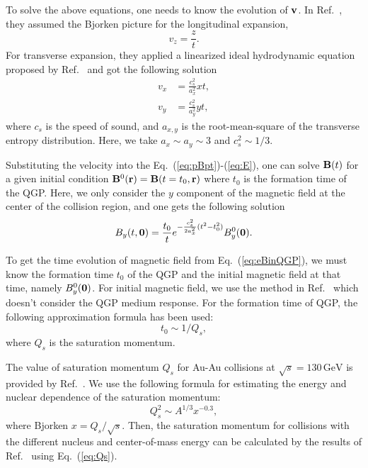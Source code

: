 \documentclass[preprint]{elsarticle}
\begin{document}
To solve the above equations, one needs to know the evolution of $\vb{v}$. In Ref.~\cite{Deng:2012pc}, they assumed the Bjorken picture for the longitudinal expansion,
\begin{equation}
v_z = \frac{z}{t}.
\end{equation}
For transverse expansion, they applied a linearized ideal hydrodynamic equation proposed by Ref.~\cite{Ollitrault:2008zz} and got the following solution
\begin{align}
v_x &= \frac{c_s^2}{a_x^2} xt, \\
v_y &= \frac{c_s^2}{a_y^2} yt,
\end{align}
where $c_s$ is the speed of sound, and $a_{x,y}$ is the root-mean-square of the transverse entropy distribution. Here, we take $a_x \sim a_y \sim 3$ and $c_s^2 \sim 1/3$.

Substituting the velocity into the Eq.~(\ref{eq:pBpt})-(\ref{eq:E}), one can solve $\vb{B}(t)$ for a given initial condition $\vb{B}^0(\vb{r}) = \vb{B}(t=t_0, \vb{r})$ where $t_0$ is the formation time of the QGP. Here, we only consider the $y$ component of the magnetic field at the center of the collision region, and one gets the following solution
\begin{equation}
B_y(t,\vb{0}) = \frac{t_0}{t} e^{-\frac{c_s^2}{2a_x^2}(t^2 - t_0^2)} B_y^0(\vb{0}). \label{eq:eBinQGP}
\end{equation}

To get the time evolution of magnetic field from Eq.~(\ref{eq:eBinQGP}), we must know the formation time $t_0$ of the QGP and the initial magnetic field at that time, namely $B_y^0(\vb{0})$. For initial magnetic field, we use the method in Ref.~\cite{Mo:2013qya} which doesn't consider the QGP medium response. For the formation time of QGP, the following approximation formula has been used:
\begin{equation}
t_0 \sim 1 / Q_{s},
\end{equation}
where $Q_s$ is the saturation momentum.

The value of saturation momentum $Q_s$ for Au-Au collisions at $\sqrt{s} = 130\,\mathrm{GeV}$ is provided by Ref.~\cite{Kharzeev:2000ph}. We use the following formula for estimating the energy and nuclear dependence of the saturation momentum\cite{Kowalski:2007rw}:
\begin{equation}
Q_s^2 \sim A^{1/3} x^{-0.3}, \label{eq:Qs}
\end{equation}
where Bjorken $x = Q_s/\sqrt{s}$. Then, the saturation momentum for collisions with the different nucleus and center-of-mass energy can be calculated by the results of Ref.~\cite{Kharzeev:2000ph} using Eq.~(\ref{eq:Qs}).
\end{document}
